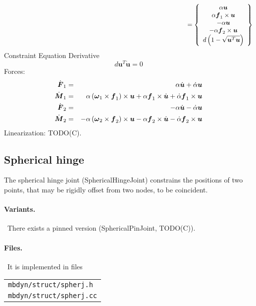 \documentclass[10pt,dvips,fleqn,subeqn]{report}
\newcommand{\T}[1]{\boldsymbol{#1}}
\begin{document}
\begin{equation}
	\mbox{\hspace{100mm}} = \cubr{\cvvect{
		\alpha \T{u} \\
		\alpha \T{f}_1\times\T{u} \\
		-\alpha \T{u} \\
		-\alpha \T{f}_2\times\T{u} \\
		d\plbr{1 - \sqrt{\T{u}^T \T{u}}}
	}}
\end{equation}
Constraint Equation Derivative
\begin{equation}
	d \T{u}^T\dot{\T{u}} = 0
\end{equation}
Forces:
\begin{eqnarray}
	\dot{\T{F}}_1 & = &  \alpha \dot{\T{u}} + \dot{\alpha} \T{u} \\
	\dot{\T{M}}_1 & = & \alpha \plbr{\T{\omega}_1\times\T{f}_1} \times \T{u} 
		+ \alpha \T{f}_1 \times \dot{\T{u}}
		+ \dot{\alpha} \T{f}_1 \times \T{u} \\
	\dot{\T{F}}_2 & = & -\alpha \dot{\T{u}} - \dot{\alpha} \T{u} \\
	\dot{\T{M}}_2 & = & -\alpha \plbr{\T{\omega}_2 \times\T{f}_2} \times \T{u}
		- \alpha \T{f}_2 \times \dot{\T{u}}
		- \dot{\alpha} \T{f}_2 \times \T{u}
\end{eqnarray}
Linearization: TODO(C).





\subsection{Spherical hinge}
The spherical hinge joint (SphericalHingeJoint) constrains the positions
of two points, that may be rigidly offset from two nodes, to be coincident.

\paragraph{Variants.} \
There exists a pinned version (SphericalPinJoint, TODO(C)).

\paragraph{Files.} \
It is implemented in files

\begin{tabular}{l}
\texttt{mbdyn/struct/spherj.h} \\
\texttt{mbdyn/struct/spherj.cc}
\end{tabular}
\end{document}

